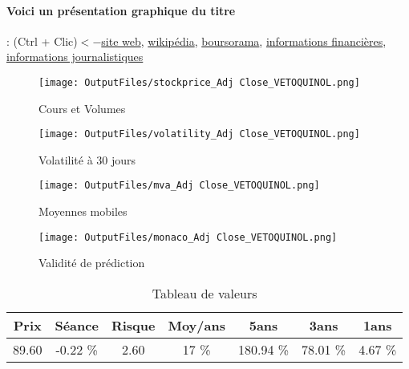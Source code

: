 \documentclass[11pt,a4paper]{report}%
\begin{document}
\paragraph{Voici un présentation graphique du titre} : (Ctrl + Clic)$<-$\href{https://www.vetoquinol.com/fr/contenu/investisseurs}{site web}, \href{https://fr.wikipedia.org/wiki/Vetoquinol}{wikipédia}, \href{https://www.boursorama.com/cours/1rPVETO}{boursorama}, \href{https://www.qwant.com/?q=site:https:%2f%2fwww.easybourse.com%2faction-societe%2fVETOQUINOL&t=web&client=ext-firefox-hp}{informations financières}, \href{https://bourse.lerevenu.com/cours-de-bourse/fiche-valeur-synthese/VETOQUINOL/VETO-FR}{informations journalistiques}
\begin{figure}[!htb]
   \begin{minipage}{0.5\textwidth}
     \centering
     \texttt{[image: OutputFiles/stockprice\_Adj Close\_VETOQUINOL.png]}
     \caption{Cours et Volumes}\label{Fig:price_VETOQUINOL}
   \end{minipage}\hfill
   \begin{minipage}{0.5\textwidth}
     \centering
     \texttt{[image: OutputFiles/volatility\_Adj Close\_VETOQUINOL.png]}
     \caption{Volatilité à 30 jours}\label{Fig:volat_VETOQUINOL}
   \end{minipage}
\end{figure}
\begin{figure}[!htb]
   \begin{minipage}{0.5\textwidth}
     \centering
     \texttt{[image: OutputFiles/mva\_Adj Close\_VETOQUINOL.png]}
     \caption{Moyennes mobiles}\label{Fig:mva_VETOQUINOL}
   \end{minipage}\hfill
   \begin{minipage}{0.5\textwidth}
     \centering
     \texttt{[image: OutputFiles/monaco\_Adj Close\_VETOQUINOL.png]}
     \caption{Validité de prédiction}\label{Fig:prediction_VETOQUINOL}
   \end{minipage}
\end{figure}

\begin{table}[H]
  \centering
    \begin{tabular}{|c|c|c|c|c|c|c|}
    \hline
    Prix & Séance & Risque  & Moy/ans & 5ans & 3ans & 1ans \\
    \hline
    89.60 &    -0.22 \%    & 2.60 & 17 \% & 180.94 \% & 78.01 \% & 4.67 \% \\
    \hline
    \end{tabular}%
        \label{tab:table_VETOQUINOL}%
      \caption{Tableau de valeurs}
\end{table}%
\end{document}
